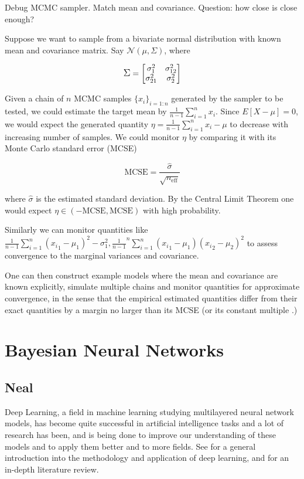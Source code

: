 \documentclass[]{report}
\begin{document}
Debug MCMC sampler. Match mean and covariance. Question: how close is close enough?

Suppose we want to sample from a bivariate normal distribution with known mean and covariance matrix. Say $\mathcal{N}(\mu,\Sigma) $, where 

\begin{displaymath}
\mathlarger{\Sigma} = 
\begin{bmatrix}
\sigma^2_1 &\sigma_{12}^2 \\
\sigma_{21}^2 &\sigma^2_2 \\
\end{bmatrix}
\end{displaymath}

Given a chain of $n$ MCMC samples $\{x_i\}_{i=1:n}$ generated by the sampler to be tested, we could estimate  the target mean by $ \frac{1}{n-1} \sum_{i=1}^ n x_i$. Since $E[X-\mu] = 0$, we would expect the generated quantity $\eta= \frac{1}{n-1} \sum_{i=1}^ n x_i -\mu$ to decrease with increasing number of samples. We could monitor $\eta$ by comparing it with its Monte Carlo standard error (MCSE) 

\[ \text{MCSE} = \frac{\hat{\sigma}}{\sqrt{n_{\text{eff}}}} \]

where $\hat{\sigma}$ is the estimated standard deviation. By the Central Limit Theorem one would expect  $\eta \in (-\text{MCSE},\text{MCSE})$ with high probability. 

Similarly we can monitor quantities like $\frac{1}{n-1} \sum_{i=1}^n ({x_i}_1 -\mu_1)^2 - \sigma^2_1,  \frac{1}{n-1}^n \sum_{i=1}^n ({x_i}_1 - \mu_1)({x_i}_2 - \mu_2)^2 $ to assess convergence to the marginal variances and covariance.

One can then construct example models where the mean and covariance are known explicitly, simulate multiple chains and monitor quantities for approximate convergence, in the sense that the empirical estimated quantities differ from their exact quantities by a margin no larger than its MCSE (or its constant multiple .) 

\chapter{Bayesian Neural Networks}
\section{Neal}

Deep Learning, a field in machine learning studying multilayered neural network models, has become quite successful in artificial intelligence tasks and a lot of research has been, and is being done to improve our understanding of these models and to apply them better and to more fields. See \cite{Goodfellow-et-al-2016-Book,lecun2015deep} for a general introduction into the methodology and application of deep learning, and \cite{schmidhuber2015deep} for an in-depth literature review. 
\end{document}

